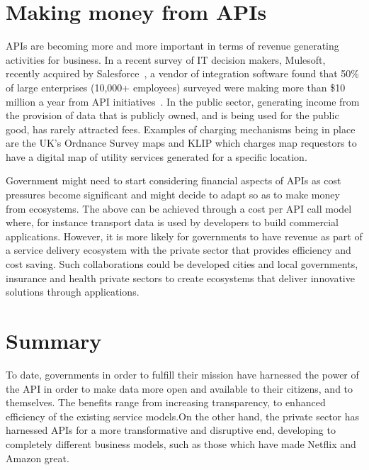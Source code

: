 \section{Making money from APIs}

APIs are becoming more and more important in terms of revenue generating activities for
business. In a recent survey of IT decision makers, Mulesoft, recently acquired
by Salesforce~\citep{mulesoft_salesforce}, a vendor of integration software found that 50\% of
large enterprises (10,000+ employees) surveyed were making more than \$10 million
a year from API initiatives~\citep{mulesoft_api_worth}. In the public sector, generating income
from the provision of data that is publicly owned, and is being used for the
public good, has rarely attracted fees. Examples of charging mechanisms being in
place are the UK’s Ordnance Survey maps and KLIP  which charges map requestors
to have a digital map of utility services generated for a specific location.

Government might need to start considering financial aspects of APIs as cost pressures
become significant and might decide to adapt so as to make money from ecosystems.
The above can be achieved through a cost per API call model where, for instance transport
data is used by developers to build commercial applications. However, it is more likely for
governments to have revenue as part of a service delivery ecosystem with the private sector
that provides efficiency and cost saving. Such collaborations could be developed cities and
local governments, insurance and health private sectors to create ecosystems that deliver
innovative solutions through applications.

\section{Summary}

To date, governments in order to fulfill their mission have harnessed the power of the API in order to make data more open and available to their citizens, and to themselves. The benefits range from increasing transparency, to enhanced efficiency of the existing service models.On the other hand, the private sector has harnessed APIs for a more transformative and disruptive end, developing to completely different business models, such as those which have made Netflix and
Amazon great.	
